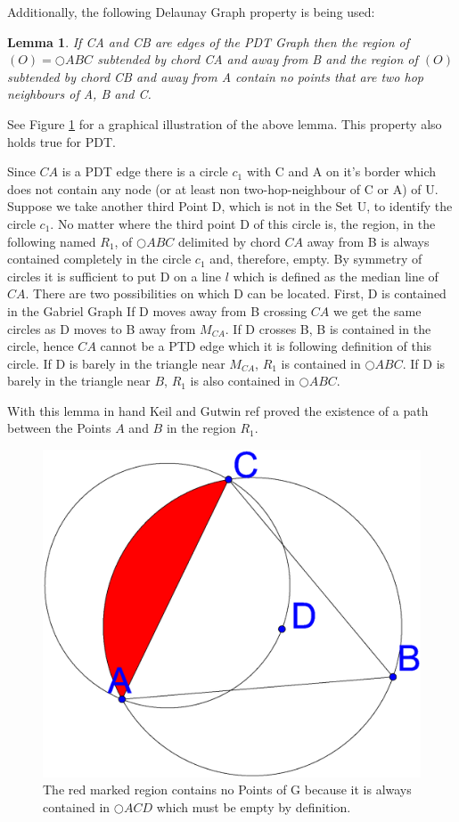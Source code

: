 \documentclass[a4paper,twoside, onecolumn]{IEEEtran}
\newtheorem{emptyregion}{Lemma}[section]
\begin{document}
Additionally, the following Delaunay Graph property is being used:
\begin{emptyregion}
\label{emptyregion}
If CA and CB are edges of the PDT Graph then the region of $(O)=\bigcirc{ABC} $ subtended by chord  CA and away from B and the region of $(O) $ subtended by chord CB and away from A contain no points that are two hop neighbours of A, B and C.
\end{emptyregion}


See Figure \ref{fig:empty_region} for a graphical illustration of the above lemma.
This property also holds true for PDT.

Since $CA $ is a PDT edge there is a circle $c_1 $ with C and A on it's border which does not contain any node (or at least non two-hop-neighbour of C or A) of U.
Suppose we take another third Point D, which is not in the Set U, to identify the circle $c_1 $.
No matter where the third point D of this circle is, the region, in the following named $R_1 $, of $\bigcirc{ABC} $ delimited by chord $CA $ away from B is always contained completely in the circle $c_1 $ and, therefore, empty.
By symmetry of circles it is sufficient to put D on a line  $l $ which is defined as the median line of $CA $. 
There are two possibilities on which D can be located. %
First, D is contained in the Gabriel Graph
If D moves away from B crossing $CA $ we get the same circles as D moves to B away from $M_{CA} $.
If D crosses B, B is contained in the circle, hence $CA $ cannot be a PTD edge which it is following definition of this circle.
If D is barely in the triangle near $M_{CA} $, $R_1 $ is contained in $\bigcirc{ABC} $.
If D is barely in the triangle near $B $, $R_1 $ is also contained in $\bigcirc{ABC} $. 


With this lemma in hand Keil and Gutwin ref proved the existence of a path between the Points $A $ and $B $ in the region $R_1 $.
\begin{figure}[h!]
\centering
\includegraphics[width=0.2\linewidth]{noPointinRegion.eps}
\caption{The red marked region contains no Points of G because it is always contained in $\bigcirc{ACD} $ which must be empty by definition.}
\label{fig:empty_region}
\end{figure}
\end{document}

